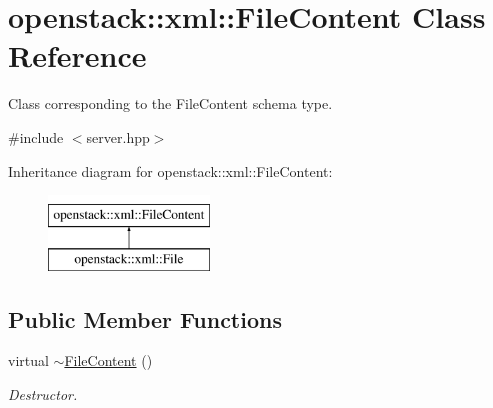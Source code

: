\hypertarget{classopenstack_1_1xml_1_1FileContent}{
\section{openstack::xml::FileContent Class Reference}
\label{classopenstack_1_1xml_1_1FileContent}
}


Class corresponding to the FileContent schema type.  




{\ttfamily \#include $<$server.hpp$>$}

Inheritance diagram for openstack::xml::FileContent:\begin{figure}[H]
\begin{center}
\leavevmode
\includegraphics[height=2.000000cm]{classopenstack_1_1xml_1_1FileContent}
\end{center}
\end{figure}
\subsection*{Public Member Functions}
\begin{DoxyCompactItemize}
\item 
\hypertarget{classopenstack_1_1xml_1_1FileContent_abd3c0ca11beadb90933b408dfce4a2c9}{
virtual \hyperlink{classopenstack_1_1xml_1_1FileContent_abd3c0ca11beadb90933b408dfce4a2c9}{$\sim$FileContent} ()}
\label{classopenstack_1_1xml_1_1FileContent_abd3c0ca11beadb90933b408dfce4a2c9}

\begin{DoxyCompactList}\small\item\em Destructor. \item\end{DoxyCompactList}\end{DoxyCompactItemize}
